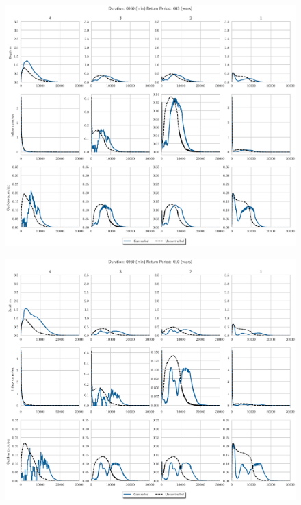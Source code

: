 \begin{figure}
    \centering
    \includegraphics[width=\linewidth]{./RL-SI-figures/77storms/0060005.eps}
\end{figure}
\begin{figure}
    \centering
    \includegraphics[width=\linewidth]{./RL-SI-figures/77storms/0060010.eps}
\end{figure}
